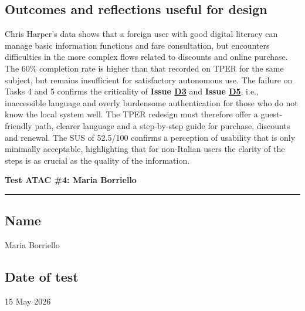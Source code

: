 ﻿\documentclass[11pt,a4paper]{article}
\begin{document}
\subsection*{Outcomes and reflections useful for design}
\begin{tcolorbox}[base]
Chris Harper's data shows that a foreign user with good digital literacy can manage basic information functions and fare consultation, but encounters difficulties in the more complex flows related to discounts and online purchase. The 60\% completion rate is higher than that recorded on TPER for the same subject, but remains insufficient for satisfactory autonomous use. The failure on Tasks 4 and 5 confirms the criticality of \textbf{Issue \hyperref[atac:D3]{D3}} and \textbf{Issue \hyperref[atac:D5]{D5}}, i.e., inaccessible language and overly burdensome authentication for those who do not know the local system well. The TPER redesign must therefore offer a guest-friendly path, clearer language and a step-by-step guide for purchase, discounts and renewal. The SUS of 52.5/100 confirms a perception of usability that is only minimally acceptable, highlighting that for non-Italian users the clarity of the steps is as crucial as the quality of the information.
\end{tcolorbox}


\newpage
\begin{center}
  {\color{secondaryColor}\large\bfseries
  Test ATAC \#4: Maria Borriello}\\
  \vspace{0.1cm}
  \color{borderColor}\hrule
\end{center}

\vspace{0.5cm}

\subsection*{Name}
\begin{tcolorbox}[base]
Maria Borriello
\end{tcolorbox}

\subsection*{Date of test}
\begin{tcolorbox}[base]
15 May 2026
\end{tcolorbox}
\end{document}
